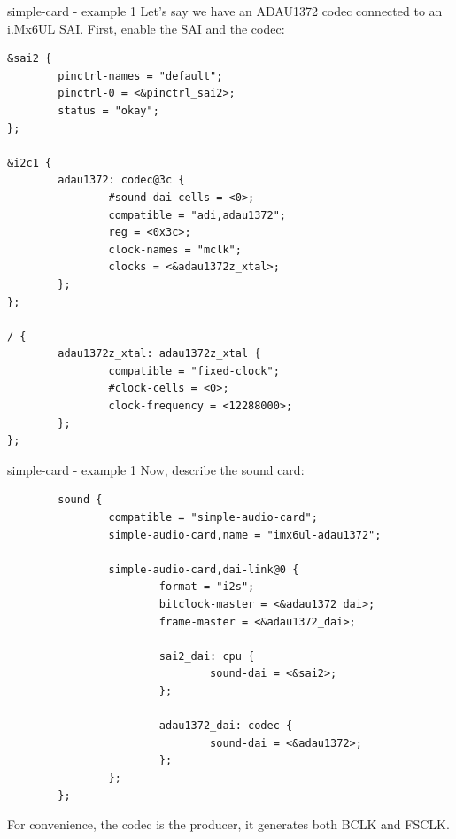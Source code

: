 \begin{frame}[fragile]{simple-card - example 1}
  Let's say we have an ADAU1372 codec connected to an i.Mx6UL SAI.
  First, enable the SAI and the codec:
  \begin{block}{}
    \fontsize{7}{6}\selectfont
    \begin{verbatim}
&sai2 {
        pinctrl-names = "default";
        pinctrl-0 = <&pinctrl_sai2>;
        status = "okay";
};

&i2c1 {
        adau1372: codec@3c {
                #sound-dai-cells = <0>;
                compatible = "adi,adau1372";
                reg = <0x3c>;
                clock-names = "mclk";
                clocks = <&adau1372z_xtal>;
        };
};

/ {
        adau1372z_xtal: adau1372z_xtal {
                compatible = "fixed-clock";
                #clock-cells = <0>;
                clock-frequency = <12288000>;
        };
};
    \end{verbatim}
  \end{block}
\end{frame}

\begin{frame}[fragile]{simple-card - example 1}
  Now, describe the sound card:
  \begin{block}{}
    \fontsize{7}{6}\selectfont
    \begin{verbatim}
        sound {
                compatible = "simple-audio-card";
                simple-audio-card,name = "imx6ul-adau1372";

                simple-audio-card,dai-link@0 {
                        format = "i2s";
                        bitclock-master = <&adau1372_dai>;
                        frame-master = <&adau1372_dai>;

                        sai2_dai: cpu {
                                sound-dai = <&sai2>;
                        };

                        adau1372_dai: codec {
                                sound-dai = <&adau1372>;
                        };
                };
        };
    \end{verbatim}
  \end{block}
  For convenience, the codec is the producer, it generates both BCLK and
  FSCLK.
\end{frame}

